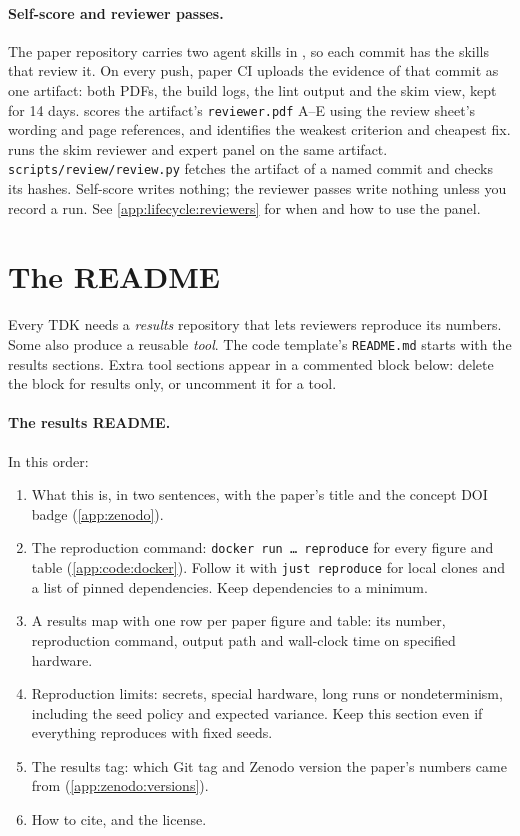 \paragraph{Self-score and reviewer passes.} The paper repository carries two agent skills in , so each commit has the skills that review it. On every push, paper CI uploads the evidence of that commit as one artifact: both PDFs, the build logs, the lint output and the skim view, kept for 14 days.  scores the artifact's \texttt{reviewer.pdf} A--E using the review sheet's wording and page references, and identifies the weakest criterion and cheapest fix.  runs the skim reviewer and expert panel on the same artifact. \texttt{scripts/review/review.py} fetches the artifact of a named commit and checks its hashes. Self-score writes nothing; the reviewer passes write nothing unless you record a run. See \cref{app:lifecycle:reviewers} for when and how to use the panel.

\section{The README}\label{app:code:readme}
Every TDK needs a \emph{results} repository that lets reviewers reproduce its numbers. Some also produce a reusable \emph{tool}. The code template's \texttt{README.md} starts with the results sections. Extra tool sections appear in a commented block below: delete the block for results only, or uncomment it for a tool.

\paragraph{The results README.} In this order:
\begin{enumerate}[noitemsep]
  \item What this is, in two sentences, with the paper's title and the concept DOI badge (\cref{app:zenodo}).
  \item The reproduction command: \texttt{docker run \dots{} reproduce} for every figure and table (\cref{app:code:docker}). Follow it with \texttt{just reproduce} for local clones and a list of pinned dependencies. Keep dependencies to a minimum.
  \item A results map with one row per paper figure and table: its number, reproduction command, output path and wall-clock time on specified hardware.
  \item Reproduction limits: secrets, special hardware, long runs or nondeterminism, including the seed policy and expected variance. Keep this section even if everything reproduces with fixed seeds.
  \item The results tag: which Git tag and Zenodo version the paper's numbers came from (\cref{app:zenodo:versions}).
  \item How to cite, and the license.
\end{enumerate}

